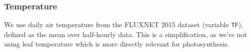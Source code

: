 \documentclass{myreport}
\begin{document}

\subsubsection{Temperature}
\label{sec:temperature}
We use daily air temperature from the FLUXNET 2015 dataset (variable \texttt{T\textunderscore F}), defined as the mean over half-hourly data. This is a simplification, as we're not using leaf temperature which is more directly relevant for photosynthesis.
\end{document}
